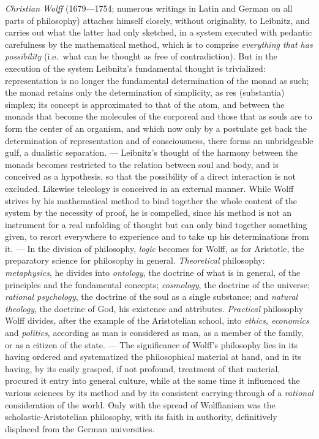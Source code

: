 \emph{Christian Wolff} (1679---1754; numerous writings in Latin and German on all parts of
philosophy) attaches himself closely, without originality, to Leibnitz, and carries out what the
latter had only sketched, in a system executed with pedantic carefulness by the mathematical method,
which is to comprise \emph{everything that has possibility} (i.e.\ what can be thought as free of
contradiction). But in the execution of the system Leibnitz's fundamental thought is trivialized:
representation is no longer the fundamental determination of the monad as such; the monad retains
only the determination of simplicity, as res (substantia) simplex; its concept is approximated to
that of the atom, and between the monads that become the molecules of the corporeal and those that
as souls are to form the center of an organism, and which now only by a postulate get back the
determination of representation and of consciousness, there forms an unbridgeable gulf, a dualistic
separation. --- Leibnitz's thought of the harmony between the monads becomes restricted to the
relation between soul and body, and is conceived as a hypothesis, so that the possibility of a
direct interaction is not excluded. Likewise teleology is conceived in an external manner. While
Wolff strives by his mathematical method to bind together the whole content of the system by the
necessity of proof, he is compelled, since his method is not an instrument for a real unfolding of
thought but can only bind together something given, to resort everywhere to experience and to take
up his determinations from it. --- In the division of philosophy, \emph{logic} becomes for Wolff, as
for Aristotle, the preparatory science for philosophy in general. \emph{Theoretical} philosophy:
\emph{metaphysics}, he divides into \emph{ontology}, the doctrine of what is in general,
of the principles and the fundamental concepts; \emph{cosmology}, the doctrine of the universe;
\emph{rational psychology}, the doctrine of the soul as a single substance; and \emph{natural
theology}, the doctrine of God, his existence and attributes. \emph{Practical} philosophy Wolff
divides, after the example of the Aristotelian school, into \emph{ethics, economics} and
\emph{politics}, according as man is considered as man, as a member of the family, or as a citizen
of the state. --- The significance of Wolff's philosophy lies in its having ordered and systematized
the philosophical material at hand, and in its having, by its easily grasped, if not profound,
treatment of that material, procured it entry into general culture, while at the same time it
influenced the various sciences by its method and by its consistent carrying-through of a
\emph{rational} consideration of the world. Only with the spread of Wolffianism was the
scholastic-Aristotelian philosophy, with its faith in authority, definitively displaced from the
German universities.

